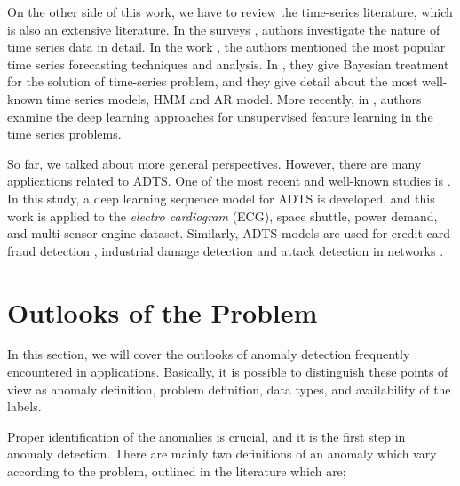 On the other side of this work, we have to review the time-series literature, which is also an extensive literature. 
In the surveys \cite{harvey1990forecasting, das1994time}, 
authors investigate the nature of time series data in detail.
In the work \cite{brockwell2002introduction}, the authors mentioned the most popular time series forecasting techniques and analysis.
In \cite{barber2011bayesian, barber2010graphical}, they give Bayesian treatment for the solution of time-series problem, and they give detail about the most well-known time series models, HMM \cite{rabiner1989tutorial} and AR model. More recently, in \cite{langkvist2014review}, authors examine the deep learning approaches for unsupervised feature learning in the time series problems.

So far, we talked about more general perspectives. However, there are many applications related to ADTS. One of the most recent and well-known studies is \cite{malhotra2015long}. In this study, a deep learning sequence model for ADTS is developed, and this work is applied to the {\it electro cardiogram} (ECG), space shuttle, power demand, and multi-sensor engine dataset. 
Similarly, ADTS models are used for credit card fraud detection \cite{srivastava2008credit, aleskerov1997cardwatch}, industrial damage detection \cite{ouyang:17, romero:16} and attack detection in networks \cite{bontemps2016collective}.

\section{Outlooks of the Problem}

In this section, we will cover the outlooks of anomaly detection frequently encountered in applications.
Basically, it is possible to distinguish these points of view as anomaly definition, problem definition, data types, and availability of the labels.

Proper identification of the anomalies is crucial, and it is the first step in anomaly detection. 
There are mainly two definitions of an anomaly which vary according to the problem, outlined in the literature which are;

